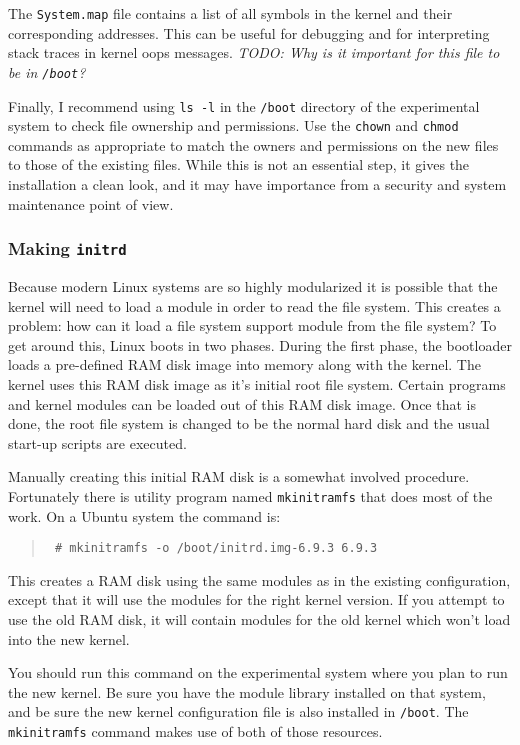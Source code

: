 \documentclass{article}
\newcommand{\command}[1]{\texttt{#1}}
\newcommand{\filename}[1]{\texttt{#1}}
\newcommand{\todo}[1]{\textit{TODO: #1}}
\newenvironment{commands}
  {\begin{quote} \tt}
  {\end{quote}}
\begin{document}
The \filename{System.map} file contains a list of all symbols in the kernel and their
corresponding addresses. This can be useful for debugging and for interpreting stack traces in
kernel oops messages. \todo{Why is it important for this file to be in \filename{/boot}?}

Finally, I recommend using \command{ls -l} in the \filename{/boot} directory of the experimental
system to check file ownership and permissions. Use the \command{chown} and \command{chmod}
commands as appropriate to match the owners and permissions on the new files to those of the
existing files. While this is not an essential step, it gives the installation a clean look, and
it may have importance from a security and system maintenance point of view.


\subsubsection{Making \filename{initrd}}

Because modern Linux systems are so highly modularized it is possible that the kernel will need
to load a module in order to read the file system. This creates a problem: how can it load a
file system support module from the file system? To get around this, Linux boots in two phases.
During the first phase, the bootloader loads a pre-defined RAM disk image into memory along with
the kernel. The kernel uses this RAM disk image as it's initial root file system. Certain
programs and kernel modules can be loaded out of this RAM disk image. Once that is done, the
root file system is changed to be the normal hard disk and the usual start-up scripts are
executed.

Manually creating this initial RAM disk is a somewhat involved procedure. Fortunately there is
utility program named \command{mkinitramfs} that does most of the work. On a Ubuntu system the
command is:
\begin{commands}
  \# mkinitramfs -o /boot/initrd.img-6.9.3 6.9.3
\end{commands}

This creates a RAM disk using the same modules as in the existing configuration, except that it
will use the modules for the right kernel version. If you attempt to use the old RAM disk, it
will contain modules for the old kernel which won't load into the new kernel.

You should run this command on the experimental system where you plan to run the new kernel. Be
sure you have the module library installed on that system, and be sure the new kernel
configuration file is also installed in \filename{/boot}. The \command{mkinitramfs} command
makes use of both of those resources.
\end{document}
